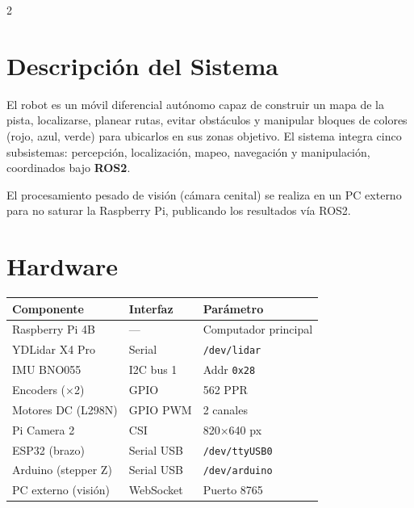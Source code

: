 \documentclass[10pt,a4paper]{article}
\begin{document}
\begin{multicols}{2}

\section{Descripción del Sistema}

El robot es un móvil diferencial autónomo capaz de construir un mapa de la pista, localizarse, planear rutas, evitar obstáculos y manipular bloques de colores (rojo, azul, verde) para ubicarlos en sus zonas objetivo. El sistema integra cinco subsistemas: percepción, localización, mapeo, navegación y manipulación, coordinados bajo \textbf{ROS2}.

El procesamiento pesado de visión (cámara cenital) se realiza en un PC externo para no saturar la Raspberry Pi, publicando los resultados vía ROS2.

\section{Hardware}

\begin{tabular}{@{}lll@{}}
\toprule
\textbf{Componente} & \textbf{Interfaz} & \textbf{Parámetro} \\
\midrule
Raspberry Pi 4B       & —          & Computador principal \\
YDLidar X4 Pro        & Serial     & \texttt{/dev/lidar} \\
IMU BNO055            & I2C bus 1  & Addr \texttt{0x28} \\
Encoders (×2)         & GPIO       & 562 PPR \\
Motores DC (L298N)    & GPIO PWM   & 2 canales \\
Pi Camera 2           & CSI        & 820×640 px \\
ESP32 (brazo)         & Serial USB & \texttt{/dev/ttyUSB0} \\
Arduino (stepper Z)   & Serial USB & \texttt{/dev/arduino} \\
PC externo (visión)   & WebSocket  & Puerto 8765 \\
\bottomrule
\end{tabular}

\vspace{4pt}


\end{multicols}
\end{document}

